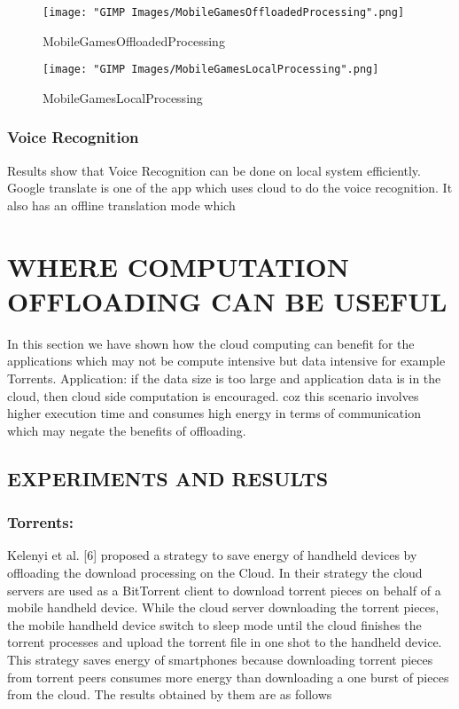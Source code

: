 \documentclass[12pt]{report}
\begin{document}
\begin{figure}[h]
  \centering
  \texttt{[image: "GIMP Images/MobileGamesOffloadedProcessing".png]}
  \caption{MobileGamesOffloadedProcessing}
  \label{fig:MobileGamesOffloadedProcessing}
\end{figure}

\begin{figure}[h]
  \centering
  \texttt{[image: "GIMP Images/MobileGamesLocalProcessing".png]}
  \caption{MobileGamesLocalProcessing}
  \label{fig:MobileGamesLocalProcessing}
\end{figure}

\subsection{Voice Recognition}
Results show that Voice Recognition can be done on local system efficiently. Google translate is one of the app which uses cloud to do the voice recognition. It also has an offline translation mode which 


\chapter{WHERE COMPUTATION OFFLOADING CAN BE USEFUL}
In this section we have shown how the cloud computing can benefit for the applications which may not be compute intensive but data intensive for example Torrents.
Application: if the data size is too large and application data is in the cloud, then cloud side computation is encouraged. coz this scenario involves higher execution time and consumes high energy in terms of communication which may negate the benefits of offloading.
\section{EXPERIMENTS AND RESULTS}
\subsection{Torrents:}
Kelenyi et al. [6] proposed a strategy to save energy of handheld devices by offloading the download processing on the Cloud. In their strategy the cloud servers are used as a BitTorrent client to download torrent pieces on behalf of a mobile handheld device. While the cloud server downloading the torrent pieces, the mobile handheld device switch to sleep mode until the cloud finishes the torrent processes and upload the torrent file in one shot to the handheld device. This strategy saves energy of smartphones because downloading torrent pieces from torrent peers consumes more energy than downloading a one burst of pieces from the cloud. The results obtained by them are as follows
\end{document}
